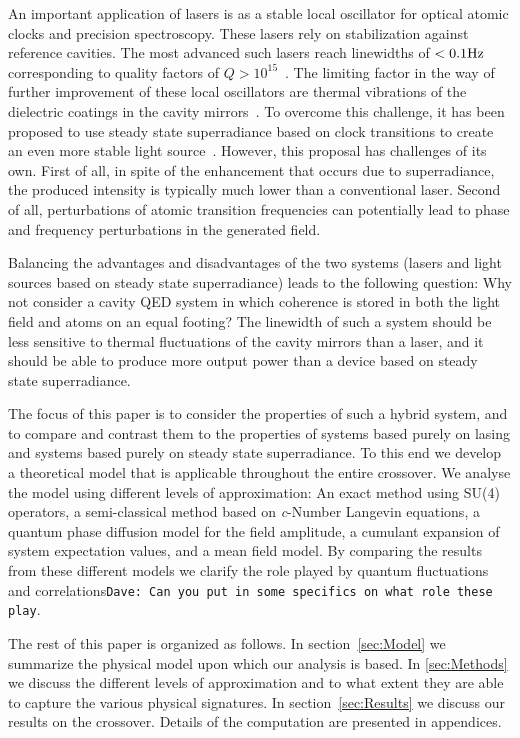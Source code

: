 \documentclass[aps,prl,twocolumn,
superscriptaddress,groupedaddress]{revtex4}
\newcommand{\dmcomment}[1]{{\tt #1}}
\begin{document}
An important application of lasers is as a stable local oscillator for
optical atomic clocks and precision spectroscopy.  These lasers rely
on stabilization against reference cavities.  The most advanced such
lasers reach linewidths of $< 0.1 {\rm Hz}$ corresponding to quality
factors of $Q>10^{15}$~\cite{Cole:TenfoldReductionBrownianNoise}.  The
limiting factor in the way of further improvement of these local
oscillators are thermal vibrations of the dielectric coatings in the
cavity mirrors~\cite{PhysRevLett.101.260602}.  To overcome this
challenge, it has been proposed to use steady state superradiance based
on clock transitions to create an even more stable light
source~\cite{prospectsofamillihertzlaser,ChenDeliciousLaser}.  However,
this proposal has challenges of its own.  First of all, in spite of the
enhancement that occurs due to superradiance, the produced intensity is
typically much lower than a conventional laser.  Second of all,
perturbations of atomic transition frequencies can potentially lead to
phase and frequency perturbations in the generated field.

Balancing the advantages and disadvantages of the two systems (lasers
and light sources based on steady state superradiance) leads to the
following question: Why not consider a cavity QED system in which
coherence is stored in both the light field and atoms on an equal
footing? The linewidth of such a system should be less sensitive to
thermal fluctuations of the cavity mirrors than a laser, and it should
be able to produce more output power than a device based on steady state
superradiance.

The focus of this paper is to consider the properties of such a hybrid
system, and to compare and contrast them to the properties of systems
based purely on lasing and systems based purely on steady state
superradiance.  To this end we develop a theoretical model that is
applicable throughout the entire crossover.  We analyse the model using
different levels of approximation: An exact method using SU(4)
operators, a semi-classical method based on {\it c}-Number Langevin
equations, a quantum phase diffusion model for the field amplitude, a
cumulant expansion of system expectation values, and a mean field model.
By comparing the results from these different models we clarify the
role played by quantum fluctuations and correlations\dmcomment{Dave: Can
you put in some specifics on what role these play}.

The rest of this paper is organized as follows.  In section~\ref{sec:Model}
we summarize the physical model upon which our analysis is based.  In
\ref{sec:Methods} we discuss the different levels of approximation
and to what extent they are able to capture the various physical
signatures.  In section~\ref{sec:Results} we discuss our results on the
crossover.  Details of the computation are presented in appendices.
\end{document}
